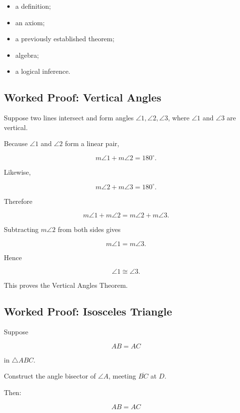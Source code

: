 \begin{itemize}
    \item a definition;
    \item an axiom;
    \item a previously established theorem;
    \item algebra;
    \item a logical inference.
\end{itemize}

\subsection{Worked Proof: Vertical Angles}
\label{subsec:proof-vertical-angles}

Suppose two lines intersect and form angles \(\angle1,\angle2,\angle3\),
where \(\angle1\) and \(\angle3\) are vertical.

Because \(\angle1\) and \(\angle2\) form a linear pair,

\[ m\angle1+m\angle2=180^\circ. \]

Likewise,

\[ m\angle2+m\angle3=180^\circ. \]

Therefore

\[ m\angle1+m\angle2=m\angle2+m\angle3. \]

Subtracting \(m\angle2\) from both sides gives

\[ m\angle1=m\angle3. \]

Hence

\[ \boxed{\angle1\cong\angle3.} \]

This proves the Vertical Angles Theorem.

\subsection{Worked Proof: Isosceles Triangle}
\label{subsec:proof-isosceles-triangle}

Suppose

\[ AB=AC \]

in \(\triangle ABC\).

Construct the angle bisector of \(\angle A\), meeting \(\overline{BC}\) at
\(D\).

Then:

\[ AB=AC \]

